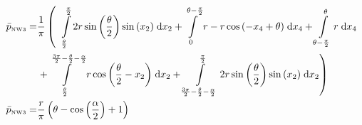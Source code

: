 \begin{align}
    \bar{p}_{\text{\tiny{NW3}}} =&\frac{1}{\pi} \left(\;\;\int\limits_{\frac{\theta}{2}}^{\frac{\pi}{2}}2 r \sin{\left (\frac{\theta}{2} \right )} \sin{\left (x_{2} \right )}\;\mathrm{d}x_{2}+\int\limits_{0}^{\theta - \frac{\pi}{2}}r - r \cos{\left (- x_{4} + \theta \right )}\;\mathrm{d}x_{4}+\int\limits_{\theta - \frac{\pi}{2}}^{\theta}r\;\mathrm{d}x_{4}\right.\notag\\
 &\left.+\int\limits_{\frac{\theta}{2}}^{\frac{3 \pi}{2} - \frac{\theta}{2} - \frac{\alpha}{2}}r \cos{\left (\frac{\theta}{2} - x_{2} \right )}\;\mathrm{d}x_{2}+\int\limits_{\frac{3 \pi}{2} - \frac{\theta}{2} - \frac{\alpha}{2}}^{\frac{\pi}{2}}2 r \sin{\left (\frac{\theta}{2} \right )} \sin{\left (x_{2} \right )}\;\mathrm{d}x_{2}\right)\label{pNW3Def}\\
    \bar{p}_{\text{\tiny{NW3}}}  =& \frac{r}{\pi} \left(\theta - \cos{\left (\frac{\alpha}{2} \right )} + 1\right)\label{pNW3Sln}
\end{align}
